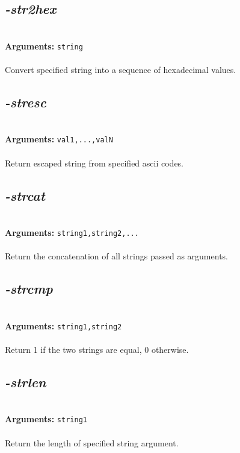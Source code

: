\documentclass[a4paper,11pt,twoside]{book}
\begin{document}
\subsection{\emph{-str2hex} }\vspace*{-0.5em}
~\\\textbf{Arguments: } 
{\small \texttt{string}}\\~\\
Convert specified string into a sequence of hexadecimal values.


\subsection{\emph{-stresc} }\vspace*{-0.5em}
~\\\textbf{Arguments: } 
{\small \texttt{val1,...,valN}}\\~\\
Return escaped string from specified ascii codes.


\subsection{\emph{-strcat} }\vspace*{-0.5em}
~\\\textbf{Arguments: } 
{\small \texttt{string1,string2,...}}\\~\\
Return the concatenation of all strings passed as arguments.


\subsection{\emph{-strcmp} }\vspace*{-0.5em}
~\\\textbf{Arguments: } 
{\small \texttt{string1,string2}}\\~\\
Return 1 if the two strings are equal, 0 otherwise.


\subsection{\emph{-strlen} }\vspace*{-0.5em}
~\\\textbf{Arguments: } 
{\small \texttt{string1}}\\~\\
Return the length of specified string argument.
\end{document}
